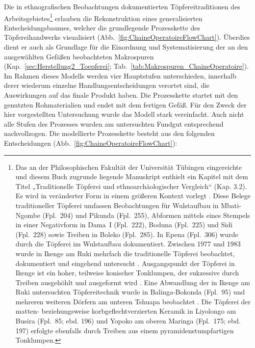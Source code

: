 \begin{multicols}{2}
Die in ethnografischen Beobachtungen dokumentierten Töpfereitraditionen des Arbeitsgebietes\footnote{Das an der Philosophischen Fakultät der Universität Tübingen eingereichte und diesem Buch zugrunde liegende Manuskript enthielt ein Kapitel mit dem Titel „Traditionelle Töpferei und ethnoarchäologischer Vergleich“ (Kap. 3.2). Es wird in veränderter Form in einem größeren Kontext vorlegt \parencite{Eggert.inVorb}. Diese Belege traditioneller Töpferei umfassen Beobachtungen für Wulstaufbau in Mbati-Ngombe (Fpl.~204) und Pikunda (Fpl.~255), Abformen mittels eines Stempels in einer Negativform in Dama~I (Fpl.~222), Boduna (Fpl.~225) und Sidi (Fpl.~228) sowie Treiben in Boleko (Fpl.~285). In Epena (Fpl.~306) wurde durch \textcite[25--36]{MpikaNgoma.1996} die Töpferei im Wulstaufbau dokumentiert. Zwischen 1977 und 1983 wurde in Ikenge am Ruki \parencite[Fpl.~20, siehe][542~Karte~1]{Wotzka.1995} mehrfach die traditionelle Töpferei beobachtet, dokumentiert und eingehend untersucht \parencites{Eggert.1980c}{Wotzka.1991}. Ausgangspunkt der Töpferei in Ikenge ist ein hoher, teilweise konischer Tonklumpen, der sukzessive durch Treiben ausgehöhlt und ausgeformt wird \parencite[414 Abb.~3]{Eggert.1980c}. Eine Abwandlung der in Ikenge am Ruki untersuchten Töpfereitechnik wurde in Balinga-Bokonda (Fpl.~95) und mehreren weiteren Dörfern am unteren Tshuapa beobachtet \parencite[188]{Wotzka.1995}. Die Töpferei der matten- beziehungsweise korbgeflechtverzierten Keramik in Liyolongo am Busira (Fpl.~85; ebd. 196) und Yopoko am oberen Maringa (Fpl.~175; ebd. 197) erfolgte ebenfalls durch Treiben aus einem pyramidenstumpfartigen Tonklumpen.\label{ftn:EthnoToepfereiBeschr}\label{ftn:EthnoToepfereiInVorb}} erlauben die Rekonstruktion eines generalisierten Entscheidungsbaumes, welcher die grundlegende Prozesskette des Töpfereihandwerks visualisiert (Abb.~\ref{fig:ChaineOperatoireFlowChart}). Überdies dient er auch als Grundlage für die Einordnung und Systematisierung der an den ausgewählten Gefäßen beobachteten Makrospuren (Kap.~\ref{sec:Herstellung2_Toepferei}; Tab.~\ref{tab:Makrospuren_ChaineOperatoire}). Im Rahmen dieses Modells werden vier Hauptstufen unterschieden, innerhalb derer wiederum einzelne Handlungsentscheidungen verortet sind, die Auswirkungen auf das finale Produkt haben. Die Prozesskette startet mit den genutzten Rohmaterialien und endet mit dem fertigen Gefäß. Für den Zweck der hier vorgestellten Untersuchung wurde das Modell stark vereinfacht. Auch nicht alle Stufen des Prozesses wurden am untersuchten Fundgut entsprechend nachvollzogen. Die modellierte Prozesskette besteht aus den folgenden Entscheidungen (Abb.~\ref{fig:ChaineOperatoireFlowChart}):

\end{multicols}
